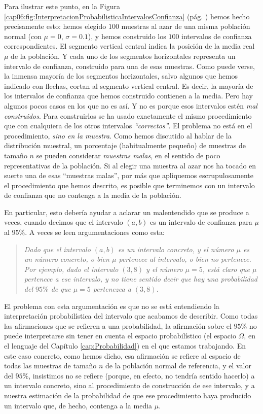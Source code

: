 Para ilustrar este punto, en la Figura \ref{cap06:fig:InterpretacionProbabilisticaIntervalosConfianza} (pág. \pageref{cap06:fig:InterpretacionProbabilisticaIntervalosConfianza}) hemos hecho precisamente esto: hemos elegido $100$ muestras al azar de una misma población normal (con $\mu=0$, $\sigma=0.1$), y hemos construido los $100$ intervalos de confianza correspondientes. El segmento vertical central indica la posición de la media real $\mu$ de la población. Y cada uno de los segmentos horizontales representa un intervalo de confianza, construido para una de esas muestras. Como puede verse, la inmensa mayoría de los segmentos horizontales, salvo algunos que hemos indicado con flechas, cortan al segmento vertical central. Es decir, la mayoría de los intervalos de confianza que hemos construido contienen a la media. Pero hay algunos pocos casos en los que no es así. Y no es porque esos intervalos estén {\em mal construidos}. Para construirlos se ha usado exactamente el mismo procedimiento que con cualquiera de los otros intervalos {\em ``correctos''}. El problema no está en el procedimiento, {\em sino en la muestra}. Como hemos discutido al hablar de la distribución muestral, un porcentaje (habitualmente pequeño) de muestras de tamaño $n$ se pueden considerar {\em muestras malas}, en el sentido de poco representativas de la población. Si al elegir una muestra al azar nos ha tocado en suerte una de esas ``muestras malas'', por más que apliquemos escrupulosamente el procedimiento que hemos descrito, es posible que terminemos con un intervalo de confianza que no contenga a la media de la población.

En particular, esto debería ayudar a aclarar un malentendido que se produce a veces, cuando decimos que  el intervalo $(a,b)$ es un intervalo de confianza  para $\mu$ al $95\%$.  A veces se leen argumentaciones como esta:
\begin{quote}
{\em Dado que el intervalo $(a,b)$ es un intervalo concreto, y el número $\mu$ es un número concreto, o bien $\mu$ pertenece al intervalo, o bien no pertenece.  Por ejemplo, dado el intervalo $(3,8)$ y el número $\mu=5$, está claro que $\mu$ pertenece a ese intervalo, y no tiene sentido decir que hay una probabilidad del $95\%$ de que $\mu=5$ pertenezca a $(3,8)$.}
\end{quote}
El problema con esta argumentación es que no se está entendiendo la interpretación probabilística del intervalo que acabamos de describir. Como todas las afirmaciones que se refieren a una probabilidad, la afirmación sobre el $95\%$ no puede interpretarse sin tener en cuenta el espacio probabilístico (el espacio $\Omega$, en el lenguaje del Capítulo \ref{cap:Probabilidad}) en el que estamos trabajando. En este caso concreto, como hemos dicho, esa afirmación se refiere al espacio de todas las muestras de tamaño $n$ de la población normal de referencia, y el valor del $95\%$, insistimos no se refiere (porque, en efecto, no tendría sentido hacerlo) a un intervalo concreto, sino al procedimiento de construcción de ese intervalo, y a nuestra estimación de la probabilidad de que ese procedimiento haya producido un intervalo que, de hecho, contenga a la media $\mu$.


